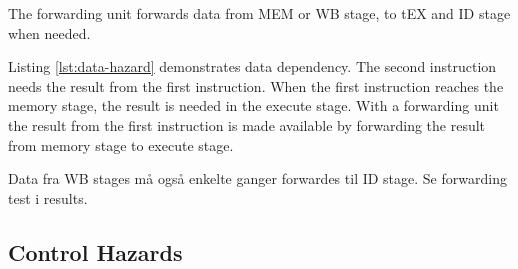 The forwarding unit forwards data from MEM or WB stage, to tEX and ID stage when needed.

Listing \ref{lst:data-hazard} demonstrates data dependency.
The second instruction needs the result from the first instruction.
When the first instruction reaches the memory stage, the result is needed in the execute stage.
With a forwarding unit the result from the first instruction is made available by forwarding the result from memory stage to execute stage.

Data fra WB stages må også enkelte ganger forwardes til ID stage. Se forwarding test i results.


\subsection{Control Hazards}
